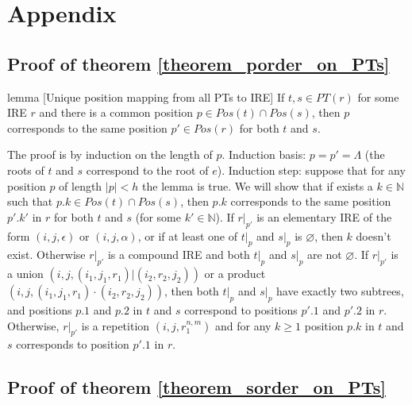 \documentclass[AMA,STIX1COL]{WileyNJD-v2}
\newcommand{\YN}{\mathbb{N}}
\begin{document}
\vfill\null
\clearpage


\section*{Appendix}

\subsection*{Proof of theorem \ref{theorem_porder_on_PTs}}

\begin{theoremEnd}{lemma}
[Unique position mapping from all PTs to IRE]
    \label{lemma_positions}
    If $t, s \in PT(r)$ for some IRE $r$
    and there is a common position $p \in Pos(t) \cap Pos(s)$,
    then $p$ corresponds to the same position $p' \in Pos(r)$ for both $t$ and $s$.
\end{theoremEnd}
\begin{proofEnd}
    The proof is by induction on the length of $p$.
    Induction basis: $p = p' = \Lambda$ (the roots of $t$ and $s$ correspond to the root of $e$).
    Induction step: suppose that for any position $p$ of length $|p| < h$ the lemma is true.
    We will show that if exists a $k \in \YN$ such that $p.k \in Pos(t) \cap Pos(s)$,
    then $p.k$ corresponds to the same position $p'.k'$ in $r$ for both $t$ and $s$ (for some $k' \in \YN$).
    If $r|_{p'}$ is an elementary IRE of the form $(i, j, \epsilon)$ or $(i, j, \alpha)$,
    or if at least one of $t|_p$ and $s|_p$ is $\varnothing$,
    then $k$ doesn't exist.
    Otherwise $r|_{p'}$ is a compound IRE and both $t|_p$ and $s|_p$ are not $\varnothing$.
    If $r|_{p'}$ is a union $(i, j, (i_1, j_1, r_1)|(i_2, r_2, j_2))$
    or a product $(i, j, (i_1, j_1, r_1)\cdot(i_2, r_2, j_2))$,
    then both $t|_p$ and $s|_p$ have exactly two subtrees,
    and positions $p.1$ and $p.2$ in $t$ and $s$ correspond to positions $p'.1$ and $p'.2$ in $r$.
    Otherwise, $r|_{p'}$ is a repetition $(i, j, r_1^{n,m})$
    and for any $k \geq 1$ position $p.k$ in $t$ and $s$ corresponds to position $p'.1$ in $r$.
\end{proofEnd}



\subsection*{Proof of theorem \ref{theorem_sorder_on_PTs}}
\end{document}

